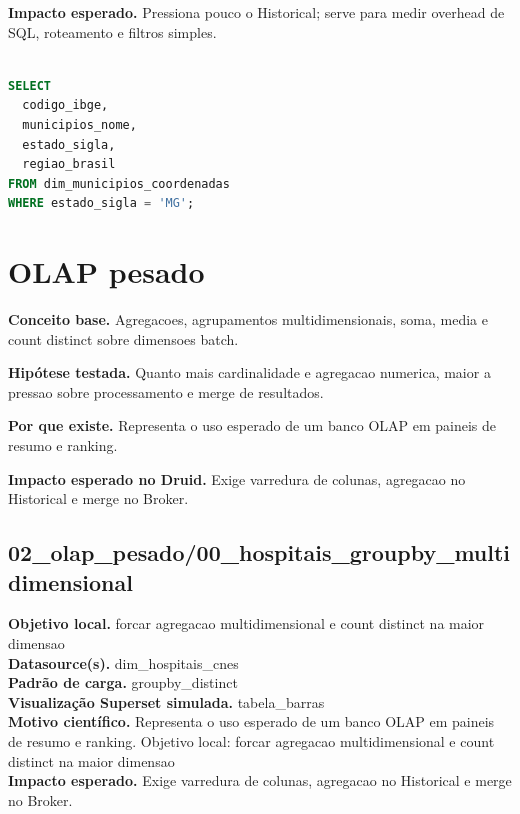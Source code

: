 \documentclass[11pt,a4paper]{article}
\begin{document}
\textbf{Impacto esperado.} Pressiona pouco o Historical; serve para medir overhead de SQL, roteamento e filtros simples.

\begin{lstlisting}[language=SQL]

SELECT
  codigo_ibge,
  municipios_nome,
  estado_sigla,
  regiao_brasil
FROM dim_municipios_coordenadas
WHERE estado_sigla = 'MG';

\end{lstlisting}

\clearpage

\section{OLAP pesado}

\textbf{Conceito base.} Agregacoes, agrupamentos multidimensionais, soma, media e count distinct sobre dimensoes batch.

\textbf{Hipótese testada.} Quanto mais cardinalidade e agregacao numerica, maior a pressao sobre processamento e merge de resultados.

\textbf{Por que existe.} Representa o uso esperado de um banco OLAP em paineis de resumo e ranking.

\textbf{Impacto esperado no Druid.} Exige varredura de colunas, agregacao no Historical e merge no Broker.

\subsection{02\_olap\_pesado/00\_hospitais\_groupby\_multidimensional}

\textbf{Objetivo local.} forcar agregacao multidimensional e count distinct na maior dimensao\\

\textbf{Datasource(s).} dim\_hospitais\_cnes\\

\textbf{Padrão de carga.} groupby\_distinct\\

\textbf{Visualização Superset simulada.} tabela\_barras\\

\textbf{Motivo científico.} Representa o uso esperado de um banco OLAP em paineis de resumo e ranking. Objetivo local: forcar agregacao multidimensional e count distinct na maior dimensao\\

\textbf{Impacto esperado.} Exige varredura de colunas, agregacao no Historical e merge no Broker.
\end{document}
